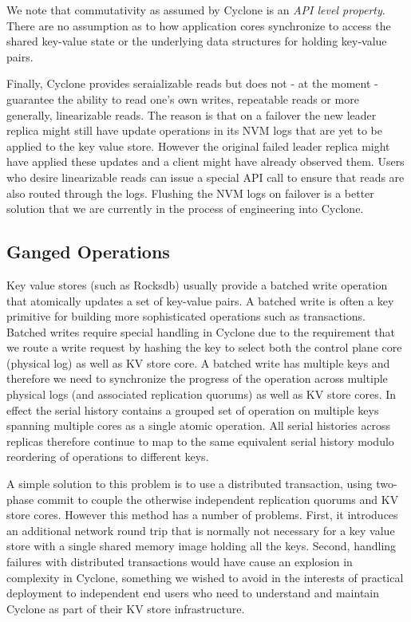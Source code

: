 \documentclass[10pt, preprint, nonatbib]{sigplanconf}
\begin{document}
We note that commutativity as assumed by Cyclone is an \emph{API level
  property}. There are no assumption as to how application cores synchronize to
access the shared key-value state or the underlying data structures for holding
key-value pairs.

Finally, Cyclone provides seraializable reads but does not - at the moment -
guarantee the ability to read one's own writes, repeatable reads or more
generally, linearizable reads. The reason is that on a failover the new leader
replica might still have update operations in its NVM logs that are yet to be
applied to the key value store. However the original failed leader replica might
have applied these updates and a client might have already observed them. Users
who desire linearizable reads can issue a special API call to ensure that reads
are also routed through the logs. Flushing the NVM logs on failover is a better
solution that we are currently in the process of engineering into Cyclone.

\subsection{Ganged Operations}
Key value stores (such as Rocksdb) usually provide a batched write operation
that atomically updates a set of key-value pairs. A batched write is often a key
primitive for building more sophisticated operations such as
transactions. Batched writes require special handling in Cyclone due to the
requirement that we route a write request by hashing the key to select both the
control plane core (physical log) as well as KV store core. A batched write has
multiple keys and therefore we need to synchronize the progress of the operation
across multiple physical logs (and associated replication quorums) as well as KV
store cores. In effect the serial history contains a grouped set of operation on
multiple keys spanning multiple cores as a single atomic operation. All serial
histories across replicas therefore continue to map to the same equivalent
serial history modulo reordering of operations to different keys.

A simple solution to this problem is to use a distributed transaction, using
two-phase commit to couple the otherwise independent replication quorums and KV
store cores. However this method has a number of problems. First, it introduces
an additional network round trip that is normally not necessary for a key value
store with a single shared memory image holding all the keys. Second, handling
failures with distributed transactions would have cause an explosion in
complexity in Cyclone, something we wished to avoid in the interests of
practical deployment to independent end users who need to understand and 
maintain Cyclone as part of their KV store infrastructure.
\end{document}
